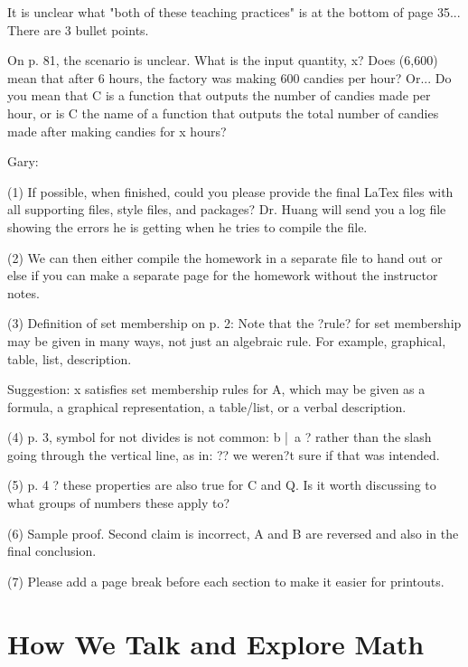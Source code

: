 \documentclass[11pt]{article}
\theoremstyle{definition}
\begin{document}
It is unclear what "both of these teaching practices" is at the bottom of page 35... There are 3 bullet points.

On p. 81, the scenario is unclear. What is the input quantity, x? Does (6,600) mean that after 6 hours, the factory was making 600 candies per hour? Or... Do you mean that C is a function that outputs the number of candies made per hour, or is C the name of a function that outputs the total number of candies made after making candies for x hours?

Gary:

(1) If possible, when finished, could you please provide the final LaTex files with all supporting files, style files, and packages? Dr. Huang will send you a log file showing the errors he is getting when he tries to compile the file.

(2) We can then either compile the homework in a separate file to hand out or else if you can make a separate page for the homework without the instructor notes.

(3) Definition of set membership on p. 2: Note that the ?rule? for set membership may be given in many ways, not just an algebraic rule. For example, graphical, table, list, description.

Suggestion: x satisfies set membership rules for A, which may be given as a formula, a graphical representation, a table/list, or a verbal description.

(4) p. 3, symbol for not divides is not common: b |\ a ?  rather than the slash going through the vertical line, as in: ?? we weren?t sure if that was intended.

(5) p. 4 ? these properties are also true for C and Q. Is it worth discussing to what groups of numbers these apply to?

(6) Sample proof. Second claim is incorrect, A and B are reversed and also in the final conclusion.

(7) Please add a page break before each section to make it easier for printouts.

\newpage 
\part{How We Talk and Explore Math} 

\setcounter{section}{-1}
\end{document}
